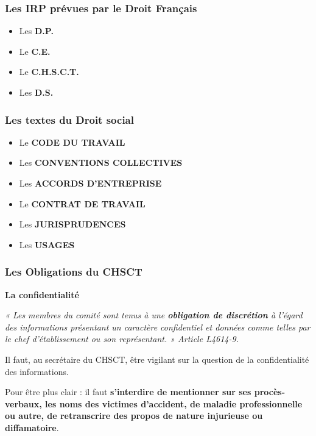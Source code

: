 \documentclass{beamer}
\begin{document}
\begin{frame}
\frametitle{Les IRP prévues par le Droit Français}
\begin{itemize}
\item Les  \textbf{D.P.}

\item Le  \textbf{C.E.}

\item Le  \textbf{C.H.S.C.T.}

\item Les  \textbf{D.S.}
\end{itemize}
\end{frame}

\begin{frame}
\frametitle{Les textes du Droit social}
\begin{itemize}
\item Le \textbf{CODE DU TRAVAIL}

\item Les \textbf{CONVENTIONS COLLECTIVES}

\item Les \textbf{ACCORDS D’ENTREPRISE}

\item Le \textbf{CONTRAT DE TRAVAIL}

\item Les \textbf{JURISPRUDENCES}

\item Les \textbf{USAGES}
\end{itemize}
\end{frame}

\begin{frame}
\frametitle{Les Obligations du CHSCT}

\textbf{La confidentialité}

\textit{«  Les membres du comité sont tenus à une \textbf{obligation de discrétion} à l'égard des informations présentant un caractère confidentiel et données comme telles par le chef d'établissement ou son représentant. » Article L4614-9.}

Il faut, au secrétaire du CHSCT, être vigilant sur la question de la confidentialité des informations. 

Pour être plus clair : il faut \textbf{s’interdire de mentionner sur ses procès-verbaux, les noms des victimes d’accident, de maladie professionnelle ou autre, de retranscrire des propos de nature injurieuse ou diffamatoire}.
\end{frame} 
\end{document}
